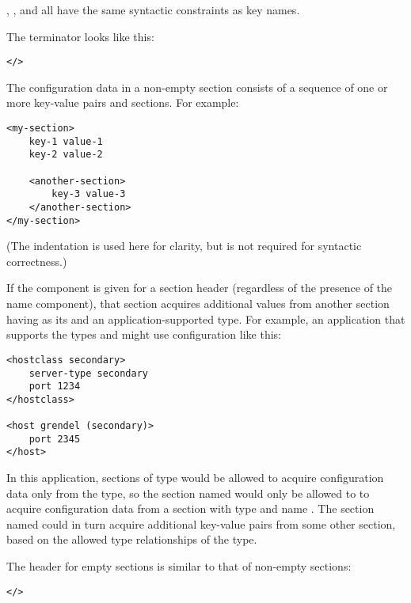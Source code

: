 \documentclass{howto}
\begin{document}
, , and  all have the same
syntactic constraints as key names.

The terminator looks like this:

\begin{alltt}
</>
\end{alltt}

The configuration data in a non-empty section consists of a sequence
of one or more key-value pairs and sections.  For example:

\begin{verbatim}
<my-section>
    key-1 value-1
    key-2 value-2

    <another-section>
        key-3 value-3
    </another-section>
</my-section>
\end{verbatim}

(The indentation is used here for clarity, but is not required for
syntactic correctness.)

If the  component is given for a section header
(regardless of the presence of the name component), that section
acquires additional values from another section having 
as its  and an application-supported type.  For example, an
application that supports the types  and 
might use configuration like this:

\begin{verbatim}
<hostclass secondary>
    server-type secondary
    port 1234
</hostclass>

<host grendel (secondary)>
    port 2345
</host>
\end{verbatim}

In this application, sections of type  would be allowed to
acquire configuration data only from the  type, so the
section named  would only be allowed to to acquire
configuration data from a section with type  and name
.  The  section named 
could in turn acquire additional key-value pairs from some other
section, based on the allowed type relationships of the
 type.

The header for empty sections is similar to that of non-empty
sections:

\begin{alltt}
<   />
\end{alltt}
\end{document}
